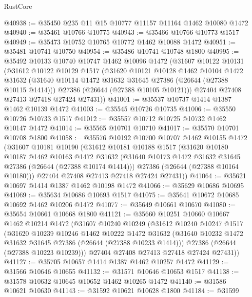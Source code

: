 \begin{lexlean}{RustCore}
\begin{coremodule}
@40938 := @35450 @235 @11 @15 @10777 @11157 @11164 @1462 @10080 @1472
@40940 := @35461 @10766 @10775
@40943 := @35466 @10766 @10773 @1517
@40949 := @35473 @10752 @10765 @10772 @1462 @10088 @1472
@40951 := @35481 @10741 @10750
@40954 := @35486 @10741 @10748 @1800
@40995 := @35492
    @10133
    @10740
    @10747
    @1462
    @10096
    @1472
    (@31607
      @10122
      @10131
      (@31612
        @10122
        @10129
        @1517
        (@31620
          @10121
          @10128
          @1462
          @10104
          @1472
          @31632
          (@31640 @10114 @1472 @31632 @31645 @27386 (@26644 (@27388 @10115 @1414)))
          @27386
          (@26644 (@27388 @10105 @10121)))
        @27404
        @27408
        @27413
        @27418
        @27424
        @27431))
@41001 := @35537 @10737 @1414 @1387 @1462 @10139 @1472
@41003 := @35545 @10726 @10735
@41006 := @35550 @10726 @10733 @1517
@41012 := @35557 @10712 @10725 @10732 @1462 @10147 @1472
@41014 := @35565 @10701 @10710
@41017 := @35570 @10701 @10708 @1800
@41058 := @35576
    @10192
    @10700
    @10707
    @1462
    @10155
    @1472
    (@31607
      @10181
      @10190
      (@31612
        @10181
        @10188
        @1517
        (@31620
          @10180
          @10187
          @1462
          @10163
          @1472
          @31632
          (@31640 @10173 @1472 @31632 @31645 @27386 (@26644 (@27388 @10174 @1414)))
          @27386
          (@26644 (@27388 @10164 @10180)))
        @27404
        @27408
        @27413
        @27418
        @27424
        @27431))
@41064 := @35621 @10697 @1414 @1387 @1462 @10198 @1472
@41066 := @35629 @10686 @10695
@41069 := @35634 @10686 @10693 @1517
@41075 := @35641 @10672 @10685 @10692 @1462 @10206 @1472
@41077 := @35649 @10661 @10670
@41080 := @35654 @10661 @10668 @1800
@41121 := @35660
    @10251
    @10660
    @10667
    @1462
    @10214
    @1472
    (@31607
      @10240
      @10249
      (@31612
        @10240
        @10247
        @1517
        (@31620
          @10239
          @10246
          @1462
          @10222
          @1472
          @31632
          (@31640 @10232 @1472 @31632 @31645 @27386 (@26644 (@27388 @10233 @1414)))
          @27386
          (@26644 (@27388 @10223 @10239)))
        @27404
        @27408
        @27413
        @27418
        @27424
        @27431))
@41127 := @35705 @10657 @1414 @1387 @1462 @10257 @1472
@41129 := @31566 @10646 @10655
@41132 := @31571 @10646 @10653 @1517
@41138 := @31578 @10632 @10645 @10652 @1462 @10265 @1472
@41140 := @31586 @10621 @10630
@41143 := @31592 @10621 @10628 @1800
@41184 := @31599

\end{coremodule}
\end{lexlean}
